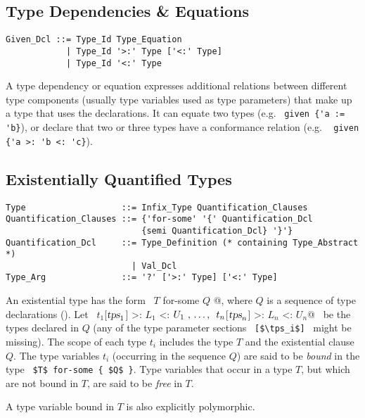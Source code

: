 \subsection{Type Dependencies \& Equations}

\syntax\begin{lstlisting}
Given_Dcl ::= Type_Id Type_Equation
            | Type_Id '>:' Type ['<:' Type]
            | Type_Id '<:' Type
\end{lstlisting}

A type dependency or equation expresses additional relations between different type components (usually type variables used as type parameters) that make up a type that uses the  declarations. It can equate two types (e.g. ~\lstinline!given {'a := 'b}!), or declare that two or three types have a conformance relation (e.g. ~ \lstinline!given {'a >: 'b <: 'c}!).





\subsection{Existentially Quantified Types}
\label{sec:existential-types}

\syntax\begin{lstlisting}[escapechar=@]
Type                   ::= Infix_Type Quantification_Clauses
Quantification_Clauses ::= {'for-some' '{' Quantification_Dcl
                           {semi Quantification_Dcl} '}'}
Quantification_Dcl     ::= Type_Definition (* containing Type_Abstract *)
                         | Val_Dcl
Type_Arg               ::= '?' ['>:' Type] ['<:' Type] 
\end{lstlisting}

An existential type has the form ~\lstinline@$T$ for-some { $Q$ }@, where $Q$ is a sequence of type declarations (). Let ~\lstinline@$t_1$[$\mbox{\sl tps}_1$] >: $L_1$ <: $U_1\ ,\, \ldots ,\,\ t_n$[$\mbox{\sl tps}_n$] >: $L_n$ <: $U_n$@~ be the types declared in $Q$ (any of the type parameter sections ~\lstinline![$\tps_i$]!~ might be missing). The scope of each type $t_i$ includes the type $T$ and the existential clause $Q$. The type variables $t_i$ (occurring in the sequence $Q$) are said to be {\em bound} in the type ~\lstinline!$T$ for-some { $Q$ }!. Type variables that occur in a type $T$, but which are not bound in $T$, are said to be {\em free} in $T$. 

A type variable bound in $T$ is also explicitly polymorphic. 

